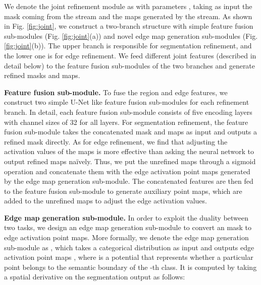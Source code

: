 \documentclass[runningheads]{llncs}
\begin{document}
We denote the joint refinement module as  with parameters , taking as input the {\SemSegPoint} mask  coming from the {\SemSeg} stream and the {\SemEdgePoint} maps  generated by the {\SemEdgeD} stream. As shown in Fig. \ref{fig:joint}, we construct a two-branch structure with simple feature fusion sub-modules (Fig. \ref{fig:joint}(a)) and novel edge map generation sub-modules (Fig. \ref{fig:joint}(b)). The upper branch is responsible for segmentation refinement, and the lower one is for edge refinement. We feed different joint features (described in detail below) to the feature fusion sub-modules of the two branches and generate refined {\SemSegPoint} masks and {\SemEdgePoint} maps.




\smallskip \noindent \textbf{Feature fusion {sub-module}.} To fuse the region and edge features, we construct two simple U-Net \cite{Ronneberger_2015} like feature fusion {sub-modules} for each refinement branch. In detail, each feature fusion {sub-module} consists of five encoding layers with channel sizes of 32 for all layers. For segmentation refinement, the feature fusion {sub-module} takes the concatenated {\SemSegPoint} mask  and {\SemEdgePoint} maps   as input and outputs a refined {\SemSegPoint} mask directly. As for edge refinement, we find that adjusting the activation values of the {\SemEdgePoint} maps is more effective than asking the neural network to output refined {\SemEdgePoint} maps na\"{i}vely. Thus, we put the unrefined {\SemEdgePoint} maps through a sigmoid operation and concatenate them with the edge activation point maps   generated by the edge map generation {sub-module}. The concatenated features are then fed to the feature fusion {sub-module} to generate auxiliary point maps, which are added to the unrefined {\SemEdgePoint} maps to adjust the edge activation values.



\smallskip \noindent \textbf{Edge map generation {sub-module}.} In order to exploit the duality between two tasks, we design an edge map generation {sub-module} to convert a{n} {\SemSegPoint} mask to edge activation point maps. More formally, we denote the edge map generation {sub-module} as , {which} takes a categorical distribution  as input and outputs edge activation point maps  , where  is a potential that represents whether a particular point  belongs to the semantic boundary of the -th class. It is computed by taking a spatial derivative on the segmentation output as follows:  
     
\end{document}
